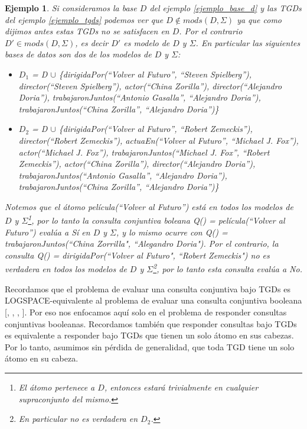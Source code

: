 \documentclass[11pt,a4paper,twoside]{tesis}
\newtheorem{exmp}{Ejemplo}
\begin{document}
\begin{exmp} \label{ejemplo_responder_consultas_bajo_tgds}
Si consideramos la base $D$ del ejemplo \ref{ejemplo_base_d} y las TGDs del ejemplo \ref{ejemplo_tgds} podemos ver que $D \notin mods(D, \Sigma)$ ya que como dijimos antes estas TGDs no se satisfacen en $D$. Por el contrario  $D\prime \in mods(D, \Sigma)$, es decir $D\prime$ es modelo de $D$ y $\Sigma$. En particular las siguientes bases de datos son dos de los modelos de  $D$ y $\Sigma$:   

\begin{itemize}
    \item 
      \(D_1\) = D \(\cup\) \{\textit{dirigidaPor(``Volver al Futuro'', ``Steven Spielberg''), director(``Steven Spielberg''),
    actor(``China Zorilla''), director(``Alejandro Doria''), trabajaronJuntos(``Antonio Gasalla'', ``Alejandro Doria''), trabajaronJuntos(``China Zorilla'', ``Alejandro Doria'')}\}
    \item  \(D_2\) = D \(\cup\)  \{\textit{dirigidaPor(``Volver al Futuro'', ``Robert Zemeckis''), director(``Robert Zemeckis''), actuaEn(``Volver al Futuro'', ``Michael J. Fox''), actor(``Michael J. Fox''), trabajaronJuntos(``Michael J. Fox'', ``Robert Zemeckis''),  actor(``China Zorilla''), director(``Alejandro Doria''), trabajaronJuntos(``Antonio Gasalla'', ``Alejandro Doria''), trabajaronJuntos(``China Zorilla'', ``Alejandro Doria'')}\}

\end{itemize} 

Notemos que el átomo \textit{película(``Volver al Futuro'')} está en todos los \textit{modelos} de $D$ y $\Sigma$\footnote{El átomo pertenece a $D$, entonces estará trivialmente en cualquier supraconjunto del mismo.}, por lo tanto la consulta conjuntiva boleana \textit{Q() = película(``Volver al Futuro'')} evalúa a \textit{Sí} en $D$ y $\Sigma$, y lo mismo ocurre con Q() = trabajaronJuntos(``China Zorrilla", ``Alegandro Doria"). Por el contrario, la consulta Q() = dirigidaPor(``Volver al Futuro", ``Robert Zemeckis") no es verdadera en todos los \textit{modelos} de $D$ y $\Sigma$\footnote{En particular no es verdadera en $D_2$.}, por lo tanto esta consulta evalúa a \textit{No}.
\end{exmp} 

Recordamos que el problema de evaluar una consulta conjuntiva bajo TGDs es LOGSPACE-equivalente al problema de evaluar una consulta conjuntiva booleana [\cite{Chandra}, \cite{Deutsch}, \cite{Fagin}, \cite{Johnson}]. Por eso nos enfocamos aquí solo en el problema de responder consultas conjuntivas booleanas. Recordamos también que responder consultas bajo TGDs es equivalente a responder bajo TGDs que tienen un solo átomo en sus cabezas. Por lo tanto, asumimos sin pérdida de generalidad, que toda TGD tiene un solo átomo en su cabeza.
\end{document}
